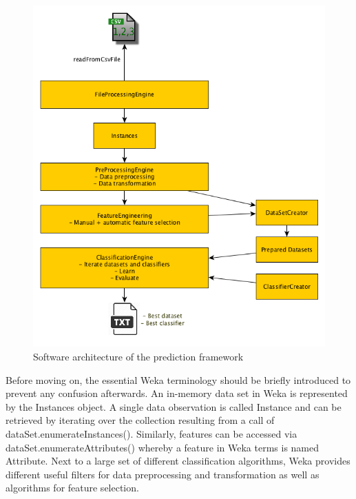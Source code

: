 \begin{figure}
	\centering
	\includegraphics[width=1.0\textwidth]{img/softwareArchitecture.png}
	\caption{Software architecture of the prediction framework}
	\label{fig:softwareArchitecture}
\end{figure} 

Before moving on, the essential Weka terminology should be briefly introduced to prevent any confusion afterwards. An in-memory data set in Weka is represented by the Instances object. A single data observation is called Instance and can be retrieved by iterating over the collection resulting from a call of dataSet.enumerateInstances(). Similarly, features can be accessed via dataSet.enumerateAttributes() whereby a feature in Weka terms is named Attribute. Next to a large set of different classification algorithms, Weka provides different useful filters for data preprocessing and transformation as well as algorithms for feature selection. 

